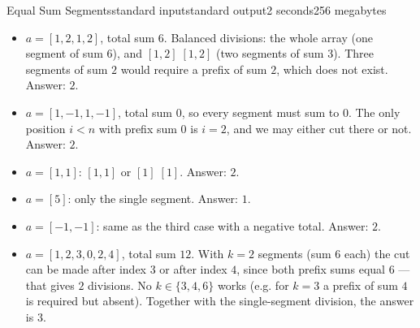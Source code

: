 \begin{problem}{Equal Sum Segments}{standard input}{standard output}{2 seconds}{256 megabytes}
\begin{itemize}
  \item $a = [1, 2, 1, 2]$, total sum $6$. Balanced divisions: the whole array (one segment of sum $6$), and $[1, 2]\;[1, 2]$ (two segments of sum $3$). Three segments of sum $2$ would require a prefix of sum $2$, which does not exist. Answer: $2$.
  \item $a = [1, -1, 1, -1]$, total sum $0$, so every segment must sum to $0$. The only position $i < n$ with prefix sum $0$ is $i = 2$, and we may either cut there or not. Answer: $2$.
  \item $a = [1, 1]$: $[1, 1]$ or $[1]\;[1]$. Answer: $2$.
  \item $a = [5]$: only the single segment. Answer: $1$.
  \item $a = [-1, -1]$: same as the third case with a negative total. Answer: $2$.
  \item $a = [1, 2, 3, 0, 2, 4]$, total sum $12$. With $k = 2$ segments (sum $6$ each) the cut can be made after index $3$ or after index $4$, since both prefix sums equal $6$ --- that gives $2$ divisions. No $k \in \{3, 4, 6\}$ works (e.g. for $k = 3$ a prefix of sum $4$ is required but absent). Together with the single-segment division, the answer is $3$.
\end{itemize}


\end{problem}

